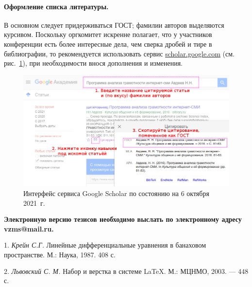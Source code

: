 \documentclass{vzmsthesis}
\begin{document}
\paragraph{Оформление списка литературы.}
В основном следует придерживаться ГОСТ;
фамилии авторов выделяются курсивом.
Поскольку оргкомитет искренне полагает, что у участников конференции есть более интересные дела,
чем сверка дробей и тире в библиографии,
то рекомендуется использовать сервис \href{https://scholar.google.com/}{scholar.google.com}
(см. рис.~\ref{Ivanoff:fig:google-scholar}),
при необходимости внося дополнения и изменения.

\begin{figure}
	\centering
	\includegraphics[width=\linewidth]{pic/google-scholar.png}
	\caption{Интерфейс сервиса Google Scholar по состоянию на 6 октября 2021~г.}
	\label{Ivanoff:fig:google-scholar}
\end{figure}


\begin{center}
	\textbf{Электронную версию тезисов необходимо выслать по электронному адресу vzms@mail.ru.}
\end{center}

\litlist

1. {\it Крейн С.Г.} Линейные дифференциальные уравнения в банаховом пространстве. М.: Наука, 1987. 408 с.

2. {\it Львовский С. М.} Набор и верстка в системе \LaTeX. М.: МЦНМО, 2003. — 448 с.
\end{document}
